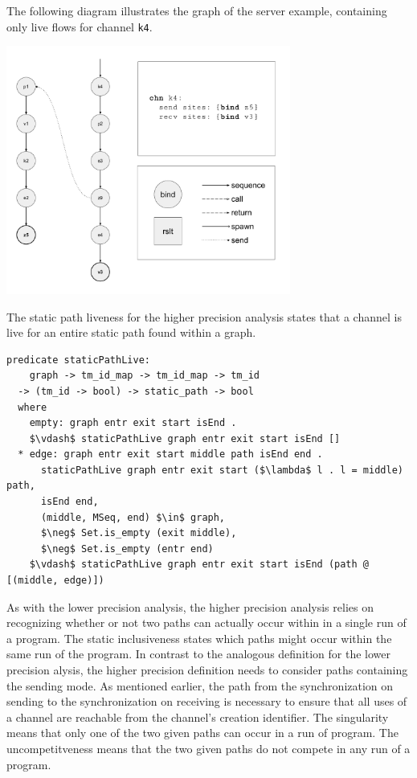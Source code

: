 \documentclass[letterpaper, 11pt]{report}
\begin{document}
The following diagram illustrates the graph of the server example,
containing only live flows for channel \lstinline{k4}. \

\includegraphics[width=0.7\textwidth]{cml-graph-k4.pdf}

The static path liveness for the higher precision analysis states
that a channel is live for an entire static path found within a graph.

\begin{lstlisting}[language=logic, mathescape]
  predicate staticPathLive:
    graph -> tm_id_map -> tm_id_map -> tm_id
  -> (tm_id -> bool) -> static_path -> bool
  where
    empty: graph entr exit start isEnd .
    $\vdash$ staticPathLive graph entr exit start isEnd []
  * edge: graph entr exit start middle path isEnd end .
      staticPathLive graph entr exit start ($\lambda$ l . l = middle) path,
      isEnd end,
      (middle, MSeq, end) $\in$ graph,
      $\neg$ Set.is_empty (exit middle),
      $\neg$ Set.is_empty (entr end)
    $\vdash$ staticPathLive graph entr exit start isEnd (path @ [(middle, edge)])

\end{lstlisting}

As with the lower precision analysis, the higher precision analysis relies on recognizing
whether or not two paths can actually occur within in a single run of a program. The static
inclusiveness states which paths might occur within the same run of the program.
In contrast to the analogous definition for the lower precision
alysis, the higher precision definition needs to consider paths containing the
sending mode. As mentioned earlier, the path from the synchronization on sending to the
synchronization on receiving is necessary to ensure that all uses of a channel are reachable
from the channel's creation identifier. The singularity means that only one of the two
given paths can occur in a run of program. The uncompetitveness means that the two
given paths do not compete in any run of a program. 
\end{document}
